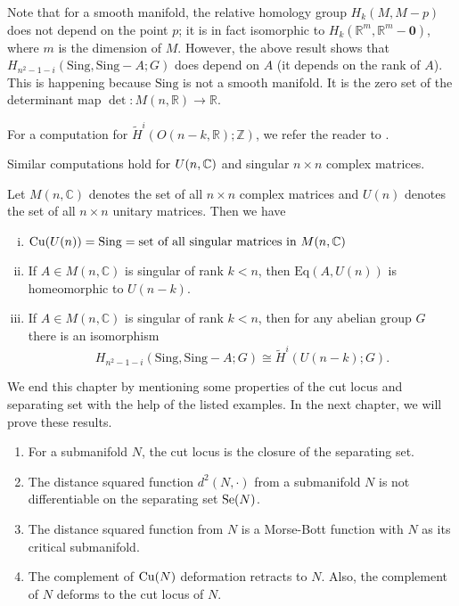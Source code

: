 \begin{rem}
    Note that for a smooth manifold, the relative homology group $H_k(M,M-p)$ does not depend on the point $p$; it is in fact isomorphic to $H_k(\mathbb{R}^m,\mathbb{R}^m-\mathbf{0})$, where $m$ is the dimension of $M$. However, the above result shows that $H_{n^2-1-i}(\mathrm{Sing},\mathrm{Sing}-A;G)$ does depend on $A$ (it depends on the rank of $A$). This is happening because $\mathrm{Sing}$ is not a smooth manifold. It is the zero set of the determinant map $\det:M(n,\mathbb{R})\to \mathbb{R}$.
\end{rem}

\noindent For a computation for $\tilde{H}^i(O(n-k,\mathbb{R});\mathbb{Z})$, we refer the reader to \cite[\S 3.D]{Hat02}.

\vspace{0.3cm}
\noindent Similar computations hold for $U(n,\C)$ and singular $n\times n$ complex matrices.

\begin{thm}
    Let $M(n,\mathbb{C})$ denotes the set of all $n\times n$ complex matrices and $U(n)$ denotes the set of all $n\times n$ unitary matrices. Then we have
    \begin{enumerate}[(i)]
        \item $\cutn[U(n)] = \mathrm{Sing} = \text{set of all singular matrices in $M(n,\mathbb{C})$}$ 
        \item If $A\in M(n,\mathbb{C})$ is singular of rank $k<n$, then $\mathrm{Eq}(A,U(n))$ is homeomorphic to $U(n-k)$.
        \item If $A\in M(n,\mathbb{C})$ is singular of rank $k<n$, then for any abelian group $G$ there is an isomorphism
        \begin{displaymath}
            H_{n^2-1-i}(\mathrm{Sing},\mathrm{Sing} -A;G) \cong \widetilde{H}^i(U(n-k);G).
        \end{displaymath}  
    \end{enumerate}
\end{thm}

\vspace{0.3cm}
\hf We end this chapter by mentioning some properties of the cut locus and separating set with the help of the listed examples. In the next chapter, we will prove these results.
\begin{enumerate}[(P1)]
    \item For a submanifold $N$, the cut locus is the closure of the separating set.
    \item The distance squared function $d^2(N,\cdot)$ from a submanifold $N$ is not differentiable on the separating set $\sen$. 
    \item The distance squared function from $N$ is a Morse-Bott function with $N$ as its critical submanifold.
    \item The complement of $\cutn$ deformation retracts to $N$. Also, the complement of $N$ deforms to the cut locus of $N$.
\end{enumerate}
